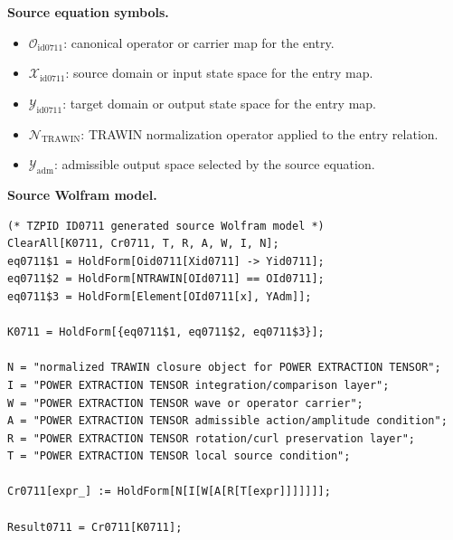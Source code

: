 \begin{minipage}[t]{0.49\linewidth}
\begingroup
\small
\raggedright
\textbf{Source equation symbols.}\par
\begin{itemize}[leftmargin=1.35em,itemsep=1pt,topsep=1pt,parsep=0pt]
    \item $\mathcal{O}_{\mathrm{id0711}}$: canonical operator or carrier map for the entry.
    \item $\mathcal{X}_{\mathrm{id0711}}$: source domain or input state space for the entry map.
    \item $\mathcal{Y}_{\mathrm{id0711}}$: target domain or output state space for the entry map.
    \item $\mathcal{N}_{\mathrm{TRAWIN}}$: TRAWIN normalization operator applied to the entry relation.
    \item $\mathcal{Y}_{\mathrm{adm}}$: admissible output space selected by the source equation.
\end{itemize}
\endgroup
\end{minipage}\hfill
\begin{minipage}[t]{0.47\linewidth}
\begingroup
\scriptsize
\raggedright
\textbf{Source Wolfram model.}\par
\begin{Verbatim}[fontsize=\tiny,breaklines=true,breakanywhere=true]
(* TZPID ID0711 generated source Wolfram model *)
ClearAll[K0711, Cr0711, T, R, A, W, I, N];
eq0711$1 = HoldForm[Oid0711[Xid0711] -> Yid0711];
eq0711$2 = HoldForm[NTRAWIN[OId0711] == OId0711];
eq0711$3 = HoldForm[Element[OId0711[x], YAdm]];

K0711 = HoldForm[{eq0711$1, eq0711$2, eq0711$3}];

N = "normalized TRAWIN closure object for POWER EXTRACTION TENSOR";
I = "POWER EXTRACTION TENSOR integration/comparison layer";
W = "POWER EXTRACTION TENSOR wave or operator carrier";
A = "POWER EXTRACTION TENSOR admissible action/amplitude condition";
R = "POWER EXTRACTION TENSOR rotation/curl preservation layer";
T = "POWER EXTRACTION TENSOR local source condition";

Cr0711[expr_] := HoldForm[N[I[W[A[R[T[expr]]]]]]];

Result0711 = Cr0711[K0711];
\end{Verbatim}
\endgroup
\end{minipage}

